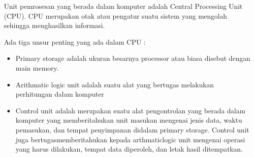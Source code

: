 \begin{enumerate}
Unit pemrosesan yang berada dalam komputer adalah Central Processing Unit (CPU). CPU merupakan otak atau pengatur suatu sistem yang mengolah sehingga menghasilkan informasi. 

Ada tiga unsur penting yang ada dalam CPU :

\begin{itemize}
\item Primary storage adalah ukuran besarnya processor atau biasa disebut dengan main memory.
\item Arithmatic logic unit adalah suatu alat yang bertugas melakukan perhitungan dalam komputer
\item Control unit adalah merupakan suatu alat pengontrolan yang berada dalam komputer yang memberitahukan unit masukan mengenai jenis data, waktu pemasukan, dan tempat penyimpanan didalam primary storage. Control unit juga bertugasmemberitahukan kepada arthmaticlogic unit mengenai operasi yang harus dilakukan, tempat data diperoleh, dan letak hasil ditempatkan.
\end{itemize}
\end{enumerate}

